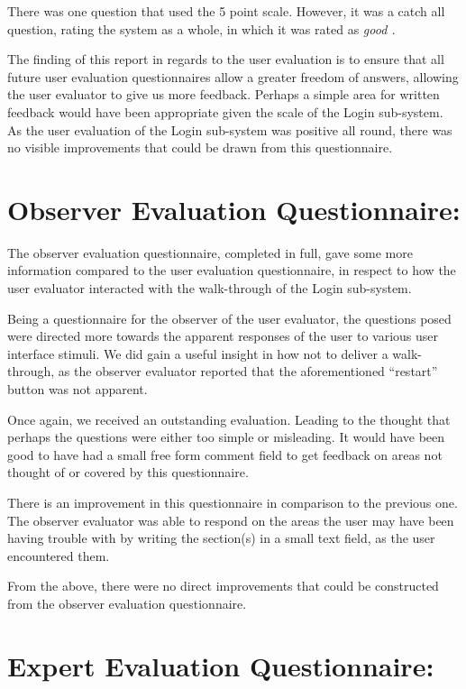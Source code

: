 There was one question that used the 5 point scale. However, it was a catch all
question, rating the system as a whole, in which it was rated as \it good \rm.

The finding of this report in regards to the user evaluation is to ensure that
all future user evaluation questionnaires allow a greater freedom of answers,
allowing the user evaluator to give us more feedback. Perhaps a simple area
for written feedback would have been appropriate given the scale of the Login
sub-system. As the user evaluation of the Login sub-system was positive all
round, there was no visible improvements that could be drawn from this
questionnaire.

\section {
	Observer Evaluation Questionnaire:
}

The observer evaluation questionnaire, completed in full, gave some more
information compared to the user evaluation questionnaire, in respect to how
the user evaluator interacted with the walk-through of the Login sub-system.

Being a questionnaire for the observer of the user evaluator, the questions
posed were directed more towards the apparent responses of the user to various
user interface stimuli. We did gain a useful insight in how not to deliver
a walk-through, as the observer evaluator reported that the aforementioned
``restart'' button was not apparent.

Once again, we received an outstanding evaluation. Leading to the thought that
perhaps the questions were either too simple or misleading. It would have been
good to have had a small free form comment field to get feedback on areas not
thought of or covered by this questionnaire.

There is an improvement in this questionnaire in comparison to the previous one.
The observer evaluator was able to respond on the areas the user may have
been having trouble with by writing the section(s) in a small text field, as the
user encountered them.

From the above, there were no direct improvements that could be constructed from
the observer evaluation questionnaire.

\section {
	Expert Evaluation Questionnaire:
}

